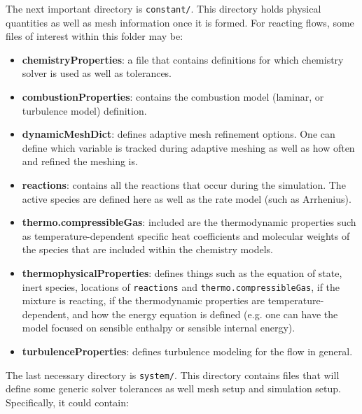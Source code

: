 The next important directory is \verb|constant/|. This directory holds physical quantities as well as mesh information once it is formed. For reacting flows, some files of interest within this folder may be:

\begin{itemize}
    \item \textbf{chemistryProperties}: a file that contains definitions for which chemistry solver is used as well as tolerances.
    \item \textbf{combustionProperties}: contains the combustion model (laminar, or turbulence model) definition.
    \item \textbf{dynamicMeshDict}: defines adaptive mesh refinement options. One can define which variable is tracked during adaptive meshing as well as how often and refined the meshing is. 
    \item \textbf{reactions}: contains all the reactions that occur during the simulation. The active species are defined here as well as the rate model (such as Arrhenius). 
    \item \textbf{thermo.compressibleGas}: included are the thermodynamic properties such as temperature-dependent specific heat coefficients and molecular weights of the species that are included within the chemistry models.
    \item \textbf{thermophysicalProperties}: defines things such as the equation of state, inert species, locations of \verb|reactions| and \verb|thermo.compressibleGas|, if the mixture is reacting, if the thermodynamic properties are temperature-dependent, and how the energy equation is defined (e.g. one can have the model focused on sensible enthalpy or sensible internal energy).
    \item \textbf{turbulenceProperties}: defines turbulence modeling for the flow in general. 
\end{itemize}

The last necessary directory is \verb|system/|. This directory contains files that will define some generic solver tolerances as well mesh setup and simulation setup. Specifically, it could contain:

